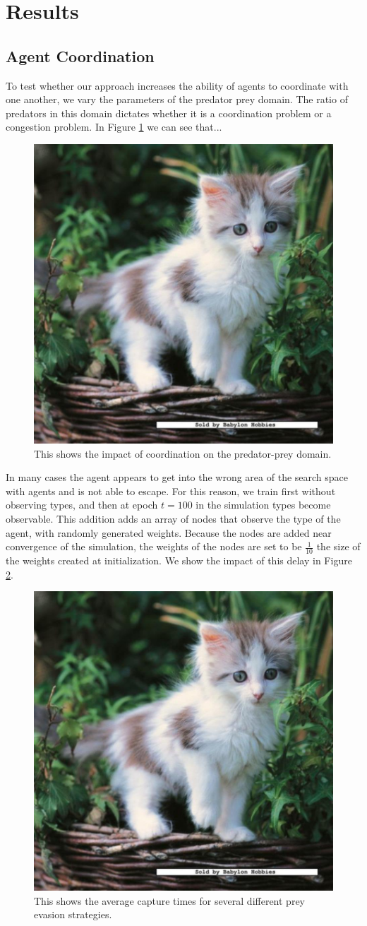 \documentclass{aamas2014}
\begin{document}
\section{Results}
\label{sec:results}

\subsection{Agent Coordination}

To test whether our approach increases the ability of agents to coordinate with one another, we vary the parameters of the predator prey domain. The ratio of predators in this domain dictates whether it is a coordination problem or a congestion problem. In Figure \ref{fig:ratio} we can see that...

\begin{figure}[h!]
\includegraphics[width=.5\textwidth]{pics/kitten}
\caption{This shows the impact of coordination on the predator-prey domain.}
\label{fig:ratio}
\end{figure}

In many cases the agent appears to get into the wrong area of the search space with agents and is not able to escape. For this reason, we train first without observing types, and then at epoch $t=100$ in the simulation types become observable. This addition adds an array of nodes that observe the type of the agent, with randomly generated weights. Because the nodes are added near convergence of the simulation, the weights of the nodes are set to be $\frac{1}{10}$ the size of the weights created at initialization. We show the impact of this delay in Figure \ref{fig:delayimpact}.


\begin{figure}[h!]
\includegraphics[width=.5\textwidth]{pics/kitten}
\caption{This shows the average capture times for several different prey evasion strategies.}
\label{fig:delayimpact}
\end{figure}
\end{document}
